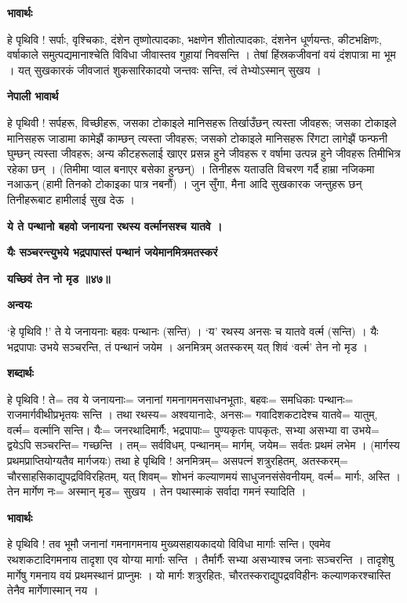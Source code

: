 \documentclass[11pt, a5paper]{article}
\begin{document}
\textbf{भावार्थः}

हे पृथिवि ! सर्पाः, वृश्चिकाः, दंशेन तृष्णोत्पादकाः, भक्षणेन शीतोत्पादकाः, दंशनेन धूर्णयन्तः, कीटभक्षिणः, वर्षाकाले समुत्पद्यमानाश्चेति विविधा जीवास्तव गुहायां निवसन्ति । तेषां हिंस्रकजीवनां वयं दंशपात्रा मा भूम । यत् सुखकारकं जीवजातं शुकसारिकादयो जन्तवः सन्ति, त्वं तेभ्योऽस्मान् सुखय ।

\textbf{नेपाली भावार्थ}

हे पृथिवी ! सर्पहरू, विच्छीहरू, जसका टोकाइले मानिसहरू तिर्खाउँछन् त्यस्ता जीवहरू; जसका टोकाइले मानिसहरू जाडामा कामेझैं काम्छन्  त्यस्ता जीवहरू; जसको टोकाइले मानिसहरू रिंगटा लागेझैं फन्फनी घुम्छन् त्यस्ता जीवहरू;  अन्य कीटहरूलाई खाएर प्रसन्न हुने जीवहरू र वर्षामा उत्पन्न हुने जीवहरू तिमीभित्र रहेका छन् । (तिमीमा प्वाल बनाएर बसेका हुन्छन्) । तिनीहरू यताउति विचरण गर्दै हाम्रा नजिकमा नआऊन् (हामी तिनको टोकाइका पात्र नबनौं) । जुन सुँगा, मैना आदि सुखकारक जन्तुहरू छन् तिनीहरूबाट हामीलाई सुख देऊ ।

\textbf{ये ते पन्थानो बहवो जनायना रथस्य वर्त्मानसश्च यातवे ।}

\textbf{यैः सञ्चरन्त्युभये भद्रपापास्तं पन्थानं जयेमानमित्रमतस्करं}

\textbf{यच्छिवं तेन नो मृड ॥४७॥}

\textbf{अन्वयः}

‘हे पृथिवि !’ ते ये जनायनाः बहवः पन्थानः (सन्ति) । ‘य’ रथस्य अनसः च यातवे वर्त्म (सन्ति) । यैः भद्रपापाः उभये सञ्चरन्ति, तं पन्थानं जयेम । अनमित्रम् अतस्करम् यत् शिवं ‘वर्त्म’ तेन नो मृड ।

\textbf{शब्दार्थः}

हे पृथिवि ! ते= तव ये जनायनाः= जनानां गमनागमनसाधनभूताः, बहवः= समधिकाः पन्थानः= राजमार्गवीथीप्रभृतयः सन्ति । तथा रथस्य= अश्वयानादेः, अनसः= गवादिशकटादेश्च यातवे= यातुम्, वर्त्म= वर्त्मानि सन्ति। यैः= जनरथादिमार्गैः, भद्रपापाः= पुण्यकृतः पापकृतः, सभ्या असभ्या वा उभये= द्वयेऽपि सञ्चरन्ति= गच्छन्ति । तम्= सर्वविधम्, पन्थानम्= मार्गम्, जयेम= सर्वतः प्रथमं लभेम । (मार्गस्य प्रथमप्राप्तियोग्यतैव मार्गजयः) तथा हे पृथिवि ! अनमित्रम्= असपत्नं शत्रुरहितम्, अतस्करम्= चौरसाहसिकाद्युपद्रविविरहितम्, यत् शिवम्= शोभनं कल्याणमयं साधुजनसंसेवनीयम्, वर्त्म= मार्गः, अस्ति । तेन मार्गेण नः= अस्मान् मृड= सुखय । तेन पथास्माकं सर्वादा गमनं स्यादिति ।

\textbf{भावार्थः}

हे पृथिवि ! तव भूमौ जनानां गमनागमनाय मुख्यसहायकादयो विविधा मार्गाः सन्ति। एवमेव रथशकटादिगमनाय तादृशा एव योग्या मार्गाः सन्ति । तैर्मार्गैः सभ्या असभ्याश्च जनाः सञ्चरन्ति । तादृशेषु मार्गेषु गमनाय वयं प्रथमस्थानं प्राप्नुमः । यो मार्गः शत्रुरहितः, चौरतस्कराद्युपद्रवविहीनः कल्याणकरश्चास्ति तेनैव मार्गेणास्मान् नय ।
\end{document}
